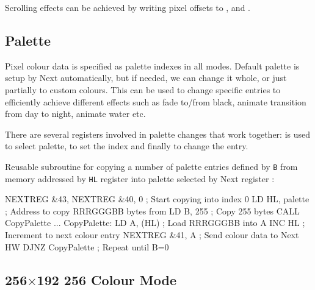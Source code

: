 Scrolling effects can be achieved by writing pixel offsets to ,  and .


\subsection{Palette}

Pixel colour data is specified as palette indexes in all modes. Default palette is setup by Next automatically, but if needed, we can change it whole, or just partially to custom colours. This can be used to change specific entries to efficiently achieve different effects such as fade to/from black, animate transition from day to night, animate water etc.

There are several registers involved in palette changes that work together:  is used to select palette,  to set the index and finally  to change the entry.

Reusable subroutine for copying a number of palette entries defined by {\tt B} from memory addressed by {\tt HL} register into palette selected by Next register :

\begin{tcblisting}{}
	NEXTREG &43, %
	NEXTREG &40, 0            ; Start copying into index 0
	LD HL, palette            ; Address to copy RRRGGGBB bytes from
	LD B, 255                 ; Copy 255 bytes
	CALL CopyPalette
	...
CopyPalette:
	LD A, (HL)                ; Load RRRGGGBB into A
	INC HL                    ; Increment to next colour entry
	NEXTREG &41, A            ; Send colour data to Next HW
	DJNZ CopyPalette          ; Repeat until B=0
\end{tcblisting}


\pagebreak
\subsection{256$\times$192 256 Colour Mode}

